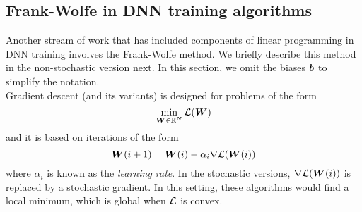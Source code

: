 \subsection{Frank-Wolfe in DNN training algorithms}

Another stream of work that has included components of linear programming in DNN training involves the Frank-Wolfe method. We briefly describe this method in the non-stochastic version next. In this section, we omit the biases ${\bm{b}}$ to simplify the notation.\\

Gradient descent (and its variants) is designed for problems of the form
%
\begin{equation}\label{eq:unconstrained}
\min_{{\bm{W}} \in \mathbb{R}^N} \mathcal{L}({\bm{W}})
\end{equation}
%
and it is based on iterations of the form
%
\begin{equation}\label{eq:gradientupdate}
{\bm{W}}(i+1) = {\bm{W}}(i) - \alpha_i \nabla \mathcal{L}({\bm{W}}(i)) 
\end{equation}
where $\alpha_i$ is known as the \emph{learning rate}. In the stochastic versions, $\nabla \mathcal{L}({\bm{W}}(i))$ is replaced by a stochastic gradient.
%
In this setting, these algorithms would find a local minimum, which is global when $\mathcal{L}$ is convex. 

